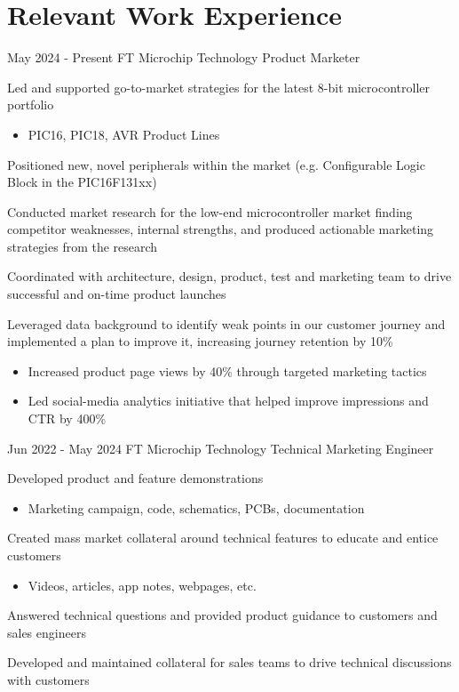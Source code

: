 \documentclass[
	12pt, %
]{FreemanCV}
\begin{document}
\section{Relevant Work Experience}

\jobentry
	{May 2024 - Present} %
	{FT} %
	{Microchip Technology} %
	{Product Marketer} %
	{ %
		\item Led and supported go-to-market strategies for the latest 8-bit microcontroller portfolio
		\begin{itemize}[noitemsep, topsep=-15pt]
			\item PIC16, PIC18, AVR Product Lines
			\end{itemize}
		\item Positioned new, novel peripherals within the market (e.g. Configurable Logic Block in the PIC16F131xx)
		\item Conducted market research for the low-end microcontroller market finding competitor weaknesses, internal strengths, and produced actionable marketing strategies from the research
		\item Coordinated with architecture, design, product, test and marketing team to drive successful and on-time product launches
		\item Leveraged data background to identify weak points in our customer journey and implemented a plan to improve it, increasing journey retention by 10\%
		\begin{itemize}[noitemsep, topsep=-15pt]
		\item Increased product page views by 40\% through targeted marketing tactics
		\item Led social-media analytics initiative that helped improve impressions and CTR by 400\%
		\end{itemize}
	} 



\jobentry
	{Jun 2022 - May 2024} %
	{FT} %
	{Microchip Technology} %
	{Technical Marketing Engineer} %
	{ %
		\item Developed product and feature demonstrations
		\begin{itemize}[topsep=-10pt]
			\item Marketing campaign, code, schematics, PCBs, documentation
			\end{itemize}
		\item Created mass market collateral around technical features to educate and entice customers 
		\begin{itemize}[topsep=-10pt]
			\item Videos, articles, app notes, webpages, etc.
			\end{itemize}
		\item Answered technical questions and provided product guidance to customers and sales engineers
		\item Developed and maintained collateral for sales teams to drive technical discussions with customers
	} 
\end{document}
